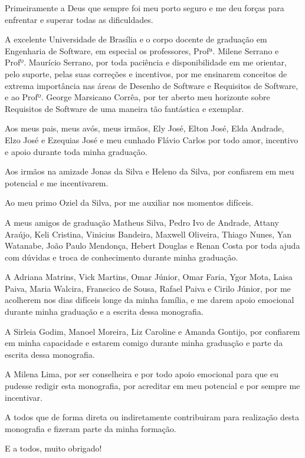 \begin{agradecimentos}

	Primeiramente a Deus que sempre foi meu porto seguro e me deu forças para enfrentar e superar todas as dificuldades.
	 
	A excelente Universidade de Brasília e o corpo docente de graduação em Engenharia de Software, em especial os professores, Profª. Milene Serrano e Profº. Maurício Serrano, por toda paciência e disponibilidade em me orientar, pelo suporte, pelas suas correções e incentivos, por me ensinarem conceitos de extrema importância nas áreas de Desenho de Software e Requisitos de Software, e ao Profº. George Marsicano Corrêa, por ter aberto meu horizonte sobre Requisitos de Software de uma maneira tão fantástica e exemplar.
	
	Aos meus pais, meus avós, meus irmãos, Ely José, Elton José, Elda Andrade, Elzo José e Ezequias José e meu cunhado Flávio Carlos por todo amor, incentivo e apoio durante toda minha graduação. 
	
	Aos irmãos na amizade Jonas da Silva e Heleno da Silva, por confiarem em meu potencial e me incentivarem. 
	
	Ao meu primo Oziel da Silva, por me auxiliar nos momentos difíceis. 
	
	A meus amigos de graduação Matheus Silva, Pedro Ivo de Andrade, Attany Araújo, Keli Cristina, Vinicius Bandeira, Maxwell Oliveira, Thiago Nunes, Yan Watanabe, João Paulo Mendonça, Hebert Douglas e Renan Costa por toda ajuda com dúvidas e troca de conhecimento durante minha graduação. 
	
	A Adriana Matrins, Vick Martins, Omar Júnior, Omar Faria, Ygor Mota, Laisa Paiva, Maria Walcira, Franscico de Sousa, Rafael Paiva e Cirilo Júnior, por me acolherem nos dias difíceis longe da minha família,  e me darem apoio emocional durante minha graduação e a escrita dessa monografia. 
	
	A Sirleia Godim, Manoel Moreira, Liz Caroline e Amanda Gontijo, por confiarem em minha capacidade e estarem comigo durante minha graduação e parte da escrita dessa monografia. 
	
	A Milena Lima, por ser conselheira e por todo apoio emocional para que eu pudesse redigir esta monografia, por acreditar em meu potencial e por sempre me incentivar.
	
	A todos que de forma direta ou indiretamente contribuiram para realização desta monografia e fizeram parte da minha formação. 
	
	E a todos, muito obrigado!  
	
\end{agradecimentos}
